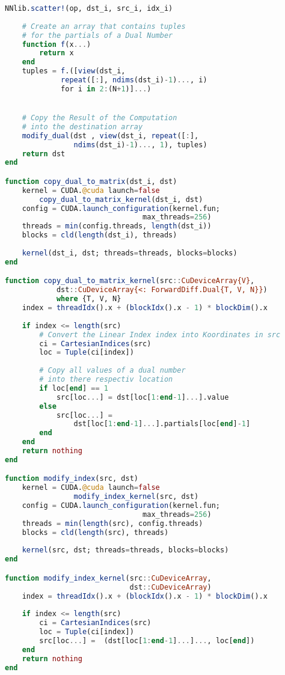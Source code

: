 \begin{lstlisting}[language=Julia]
    NNlib.scatter!(op, dst_i, src_i, idx_i) 
    
    # Create an array that contains tuples 
    # for the partials of a Dual Number
    function f(x...)
        return x
    end
    tuples = f.([view(dst_i, 
             repeat([:], ndims(dst_i)-1)..., i) 
             for i in 2:(N+1)]...)


    # Copy the Result of the Computation 
    # into the destination array
    modify_dual(dst , view(dst_i, repeat([:], 
                ndims(dst_i)-1)..., 1), tuples)
    return dst
end

function copy_dual_to_matrix(dst_i, dst)
    kernel = CUDA.@cuda launch=false 
        copy_dual_to_matrix_kernel(dst_i, dst)
    config = CUDA.launch_configuration(kernel.fun; 
                                max_threads=256)
    threads = min(config.threads, length(dst_i))
    blocks = cld(length(dst_i), threads)
    
    kernel(dst_i, dst; threads=threads, blocks=blocks)
end

function copy_dual_to_matrix_kernel(src::CuDeviceArray{V}, 
            dst::CuDeviceArray{<: ForwardDiff.Dual{T, V, N}}) 
            where {T, V, N}
    index = threadIdx().x + (blockIdx().x - 1) * blockDim().x
   
    if index <= length(src) 
        # Convert the Linear Index index into Koordinates in src
        ci = CartesianIndices(src)
        loc = Tuple(ci[index])
        
        # Copy all values of a dual number 
        # into there respectiv location
        if loc[end] == 1
            src[loc...] = dst[loc[1:end-1]...].value 
        else 
            src[loc...] = 
                dst[loc[1:end-1]...].partials[loc[end]-1]
        end
    end
    return nothing
end

function modify_index(src, dst)
    kernel = CUDA.@cuda launch=false 
                modify_index_kernel(src, dst) 
    config = CUDA.launch_configuration(kernel.fun; 
                                max_threads=256)
    threads = min(length(src), config.threads)
    blocks = cld(length(src), threads)
    
    kernel(src, dst; threads=threads, blocks=blocks)
end

function modify_index_kernel(src::CuDeviceArray, 
                             dst::CuDeviceArray)
    index = threadIdx().x + (blockIdx().x - 1) * blockDim().x
    
    if index <= length(src)
        ci = CartesianIndices(src)
        loc = Tuple(ci[index])
        src[loc...] =  (dst[loc[1:end-1]...]..., loc[end])
    end
    return nothing
end


\end{lstlisting}
